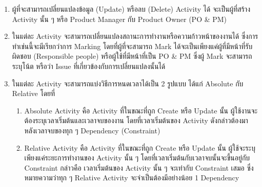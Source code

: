 \begin{enumerate}
\begin{figure}
\begin{center}
{
            }
        \end{center}
    \end{figure}
    \item ผู้ที่จะสามารถเปลี่ยนแปลงข้อมูล (Update) หรือลบ (Delete) Activity ได้ จะเป็นผู้ที่สร้าง Activity นั้น ๆ หรือ Product Manager กับ Product Owner (PO \& PM)
    \item ในแต่ละ Activity จะสามารถเปลี่ยนแปลงสถานะการทำงานหรือความก้าวหน้าของงานได้ ซึ่งการทำเช่นนี้จะมีเรียกว่าการ Marking โดยที่ผู้ที่จะสามารถ Mark ได้จะเป็นเพียงแค่ผู้ที่มีหน้าที่รับผิดชอบ (Responsible people) หรือผู้ใช้ที่มีหน้าที่เป็น PO \& PM ซึ่งผู้ Mark จะสามารถระบุโน้ต หรือว่า Issue ที่เกี่ยวข้องกับการเปลี่ยนแปลงนั้นได้
    \item ในแต่ละ Activity จะสามารถแบ่งวิธีการหนดเวลาได้เป็น 2 รูปแบบ ได้แก่ Absolute กับ Relative โดยที่ 
    \begin{enumerate}
        \item Absolute Activity คือ Activity ที่ในขณะที่ถูก Create หรือ Update นั้น ผู้ใช้งานจะต้องระบุเวลาเริ่มต้นและเวลาจบของงาน โดยที่เวลาเริ่มต้นของ Activity ดังกล่าวต้องมาหลังเวลาจบของทุก ๆ Dependency (Constraint)
        \item Relative Activity คือ Activity ที่ในขณะที่ถูก Create หรือ Update นั้น ผู้ใช้จะระบุเพียงแค่ระยะการทำงานของ Activity นั้น ๆ โดยที่เวลาเริ่มต้นกับเวลาจบนั้นจะขึ้นอยู่กับ Constraint กล่าวคือ เวลาเริ่มต้นของ Activity นั้น ๆ จะเท่ากับ Constraint เสมอ ซึ่งหมายความว่าทุก ๆ Relative Activity จะจำเป็นต้องมีอย่างน้อย 1 Dependency

\end{enumerate}
\end{enumerate}
